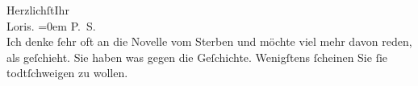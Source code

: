 \pstart
           Herzlichſt\hspace*{2.5em}Ihr{\\[\baselineskip]}\spacefill\mbox{Loris.}\pend
           \leftskip=0em{}
\pstart
           \noindent{}P. S.{\\}Ich denke ſehr oft an die Novelle vom Sterben und möchte viel mehr davon reden, als geſchieht. Sie haben was
                  gegen die Geſchichte. Wenigſtens ſcheinen Sie ſie todtſchweigen zu wollen.\pend
           \endnumbering{}  
      